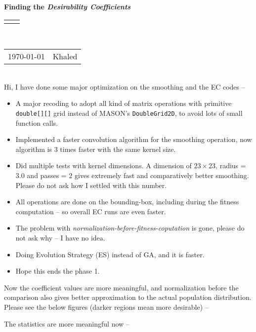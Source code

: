\documentclass[10pt]{article}
\renewcommand{\title}[1]{\textbf{#1}\\}
\renewcommand{\line}{\begin{tabularx}{\textwidth}{X>{\raggedleft}X}\hline\\\end{tabularx}\\[-0.5cm]}
\newcommand{\leftright}[2]{\begin{tabularx}{\textwidth}{X>{\raggedleft}X}#1%
& #2\\\end{tabularx}\\[-0.5cm]}
\begin{document}
\title{Finding the \emph{Desirability Coefficients}}
\line
\leftright{\vspace{0.5pt}\today}{\vspace{0.5pt}Khaled} %

\vspace{10pt}
Hi, I have done some major optimization on the smoothing and the EC codes --
	\begin{itemize}[noitemsep,nolistsep] 
		\item A major recoding to adopt all kind of matrix operations with primitive \texttt{double[][]} grid instead of MASON's \texttt{DoubleGrid2D}, to avoid lots of small function calls.
		\item Implemented a faster convolution algorithm for the smoothing operation, now algorithm is $3$ times faster with the same kernel size. 
		\item Did multiple tests with kernel dimensions. A dimension of $23 \times 23$, radius = $3.0$ and passes  = $2$ gives extremely fast and comparatively better smoothing. Please do not ask how I settled with this number.
		\item All operations are done on the bounding-box, including during the fitness computation -- so overall EC runs are even faster.
		\item The problem with \emph{normalization-before-fitness-coputation} is gone, please do not ask why -- I have no idea.
		\item Doing Evolution Strategy (ES) instead of GA, and it is faster.
		\item Hope this ends the phase 1.
	\end{itemize}
Now the coefficient values are more meaningful, and normalization before the comparison also gives better approximation to the actual population distribution. Please see the below figures (darker regions mean more desirable) --
%
\begin{figure}[H]
	\centering
\end{figure}
%
\begin{figure}[H]
	\centering
\end{figure}
%
\vfill\eject
The statistics are more meaningful now -- 
\end{document}
